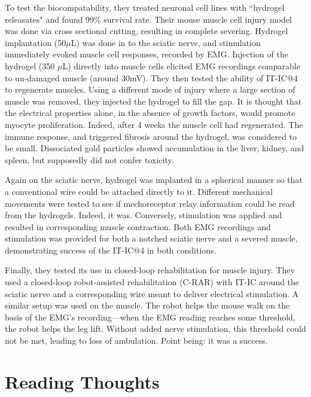 To test the biocompatability, they treated neuronal cell lines with ``hydrogel releasates" and found 99\% survival rate. Their mouse muscle cell injury model was done via cross sectional cutting, resulting in complete severing. Hydrogel implantation (50$\mu$L) was done in to the sciatic nerve, and stimulation immediately evoked muscle cell responses, recorded by EMG. Injection of the hydrogel (350 $\mu$L) directly into muscle cells elicited EMG recordings comparable to un-damaged muscle (around 30mV). They then tested the ability of IT-IC@4 to regenerate muscles. Using a different mode of injury where a large section of muscle was removed, they injected the hydrogel to fill the gap. It is thought that the electrical properties alone, in the absence of growth factors, would promote myocyte proliferation. Indeed, after 4 weeks the muscle cell had regenerated. The immune response, and triggered fibrosis around the hydrogel, was considered to be small. Dissociated gold particles showed accumulation in the liver, kidney, and spleen, but supposedly did not confer toxicity.\newline

Again on the sciatic nerve, hydrogel was implanted in a spherical manner so that a conventional wire could be attached directly to it. Different mechanical movements were tested to see if mechoreceptor relay information could be read from the hydrogels. Indeed, it was. Conversely, stimulation was applied and resulted in corresponding muscle contraction. Both EMG recordings and stimulation was provided for both a notched sciatic nerve and a severed muscle, demonstrating success of the IT-IC@4 in both conditions.\newline

Finally, they tested its use in closed-loop rehabilitation for muscle injury. They used a closed-loop robot-assisted rehabilitation (C-RAR) with IT-IC around the sciatic nerve and a corresponding wire meant to deliver electrical stimulation. A similar setup was used on the muscle. The robot helps the mouse walk on the basis of the EMG's recording---when the EMG reading reaches some threshold, the robot helps the leg lift. Without added nerve stimulation, this threshold could not be met, leading to loss of ambulation. Point being: it was a success.





\chapter{Reading Thoughts} 

